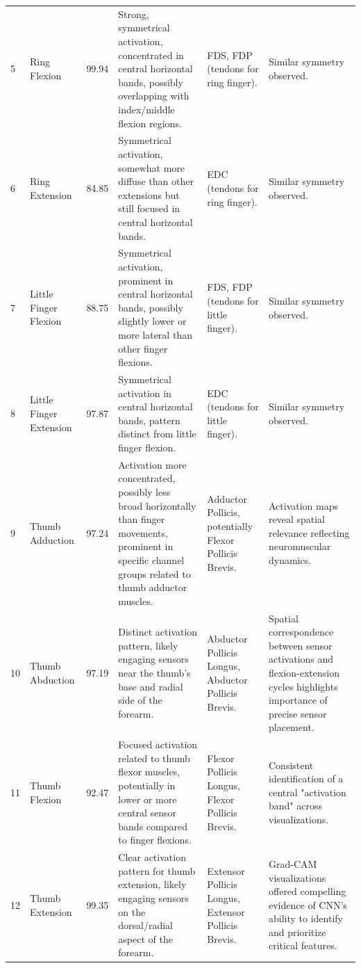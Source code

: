 \documentclass[preprint,12pt]{elsarticle}
\begin{document}
\begin{table}[!htbp]
{\begin{tabular}{L{1.2cm} L{2cm} C{2cm} L{6cm} L{6cm} L{6cm}}
5 & Ring Flexion & 99.94 & Strong, symmetrical activation, concentrated in central horizontal bands, possibly overlapping with index/middle flexion regions. & FDS, FDP (tendons for ring finger). & Similar symmetry observed. \\
\addlinespace

6 & Ring Extension & 84.85 & Symmetrical activation, somewhat more diffuse than other extensions but still focused in central horizontal bands. & EDC (tendons for ring finger). & Similar symmetry observed. \\
\addlinespace

7 & Little Finger Flexion & 88.75 & Symmetrical activation, prominent in central horizontal bands, possibly slightly lower or more lateral than other finger flexions. & FDS, FDP (tendons for little finger). & Similar symmetry observed. \\
\addlinespace

8 & Little Finger Extension & 97.87 & Symmetrical activation in central horizontal bands, pattern distinct from little finger flexion. & EDC (tendons for little finger). & Similar symmetry observed. \\
\addlinespace

9 & Thumb Adduction & 97.24 & Activation more concentrated, possibly less broad horizontally than finger movements, prominent in specific channel groups related to thumb adductor muscles. & Adductor Pollicis, potentially Flexor Pollicis Brevis. & Activation maps reveal spatial relevance reflecting neuromuscular dynamics. \\
\addlinespace

10 & Thumb Abduction & 97.19 & Distinct activation pattern, likely engaging sensors near the thumb's base and radial side of the forearm. & Abductor Pollicis Longus, Abductor Pollicis Brevis. & Spatial correspondence between sensor activations and flexion-extension cycles highlights importance of precise sensor placement. \\
\addlinespace

11 & Thumb Flexion & 92.47 & Focused activation related to thumb flexor muscles, potentially in lower or more central sensor bands compared to finger flexions. & Flexor Pollicis Longus, Flexor Pollicis Brevis. & Consistent identification of a central "activation band" across visualizations. \\
\addlinespace

12 & Thumb Extension & 99.35 & Clear activation pattern for thumb extension, likely engaging sensors on the dorsal/radial aspect of the forearm. & Extensor Pollicis Longus, Extensor Pollicis Brevis. & Grad-CAM visualizations offered compelling evidence of CNN's ability to identify and prioritize critical features. \\
\bottomrule
\end{tabular}%
}
\end{table}
\end{document}
